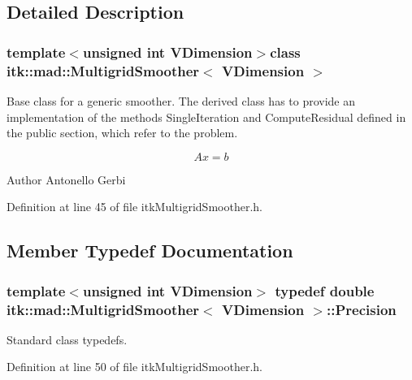 \subsection{Detailed Description}
\subsubsection*{template$<$unsigned int V\-Dimension$>$class itk\-::mad\-::\-Multigrid\-Smoother$<$ V\-Dimension $>$}

Base class for a generic smoother. The derived class has to provide an implementation of the methods Single\-Iteration and Compute\-Residual defined in the public section, which refer to the problem. 

\[ A x = b \]

\begin{DoxyAuthor}{Author}
Antonello Gerbi 
\end{DoxyAuthor}


Definition at line 45 of file itk\-Multigrid\-Smoother.\-h.



\subsection{Member Typedef Documentation}
\hypertarget{classitk_1_1mad_1_1_multigrid_smoother_a23c762f89a3b1509f0a64cfd42e82427}{
\subsubsection[{Precision}]{\setlength{\rightskip}{0pt plus 5cm}template$<$unsigned int V\-Dimension$>$ typedef double {\bf itk\-::mad\-::\-Multigrid\-Smoother}$<$ V\-Dimension $>$\-::{\bf Precision}}}\label{classitk_1_1mad_1_1_multigrid_smoother_a23c762f89a3b1509f0a64cfd42e82427}
Standard class typedefs. 

Definition at line 50 of file itk\-Multigrid\-Smoother.\-h.



